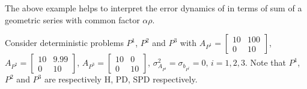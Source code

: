 The above example helps to interpret the error dynamics of  in terms of sum of a geometric series with common factor $\alpha\rho$.
\begin{example}
Consider deterministic problems $P^1$, $P^2$ and $P^3$ with $A_{P^1}=\begin{bmatrix} 10 &100\\ 0 &10\end{bmatrix}$, $A_{P^2}=\begin{bmatrix} 10 &9.99\\ 0 &10\end{bmatrix}$, $A_{P^3}=\begin{bmatrix} 10 &0 \\ 0 &10\end{bmatrix}$, $\sigma^2_{A_{P^i}}=\sigma_{b_{P^i}}=0,\,i=1,2,3$. Note that $P^1$, $P^2$ and $P^3$ are respectively H, PD, SPD respectively.
\end{example}
\begin{comment}
We now list the following observations:
\begin{itemize}%
\item In all the three instance, $0<\alpha<\frac2{10}$ ensures that the error $\norm{\eh_t}\ra 0$ as $t\ra\infty$. Thus the range of $\alpha$ is uniform across $P^i,i=1,2,3$.
\item $\rhos{P^1}=\rhod{P^1}<0$, and hence one cannot apply results of \Cref{th:pdrate}. However, with  $U=\begin{bmatrix}1 &0 \\ 0 &0.2-\epsilon\end{bmatrix}$ for some $\epsilon>0$ we have $P^1_U$ to be the distribution concentrated on the matrix $A_{P^1_U}=\begin{bmatrix} 10 &20 \\ 0 &10\end{bmatrix}$ and one can apply the results of \Cref{thm:simtran,cor:as}. Notice that the condition number $\norm{U}{U^-1}\approx 5$.
\end{itemize}
\end{comment}


